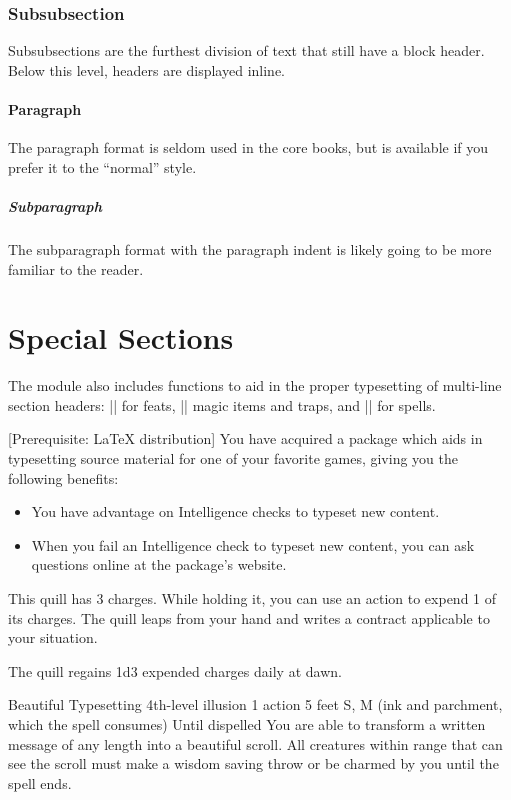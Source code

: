 \documentclass[letterpaper,twocolumn,openany,nodeprecatedcode]{wfrpgdoc}
\begin{document}
\subsubsection{Subsubsection}
Subsubsections are the furthest division of text that still have a block header. Below this level, headers are displayed inline.

\paragraph{Paragraph}
The paragraph format is seldom used in the core books, but is available if you prefer it to the ``normal'' style.

\subparagraph{Subparagraph}
The subparagraph format with the paragraph indent is likely going to be more familiar to the reader.

\section{Special Sections}
The module also includes functions to aid in the proper typesetting of multi-line section headers: |\DndFeatHeader| for feats, |\DndItemHeader| magic items and traps, and |\DndSpellHeader| for spells.

[Prerequisite: \LaTeX{} distribution]
You have acquired a package which aids in typesetting source material for one of your favorite games, giving you the following benefits:

\begin{itemize}
  \item You have advantage on Intelligence checks to typeset new content.
  \item When you fail an Intelligence check to typeset new content, you can ask questions online at the package's website.
\end{itemize}

This quill has 3 charges. While holding it, you can use an action to expend 1 of its charges. The quill leaps from your hand and writes a contract applicable to your situation.

The quill regains 1d3 expended charges daily at dawn.

\DndSpellHeader%
  {Beautiful Typesetting}
  {4th-level illusion}
  {1 action}
  {5 feet}
  {S, M (ink and parchment, which the spell consumes)}
  {Until dispelled}
You are able to transform a written message of any length into a beautiful scroll. All creatures within range that can see the scroll must make a wisdom saving throw or be charmed by you until the spell ends.
\end{document}
